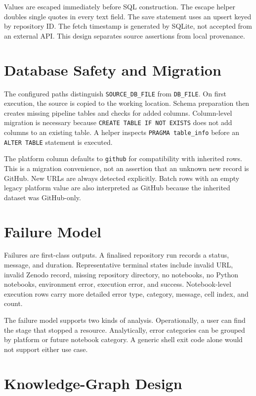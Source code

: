 Values are escaped immediately before SQL construction. The escape helper doubles single quotes in every text field. The save statement uses an upsert keyed by repository ID. The fetch timestamp is generated by SQLite, not accepted from an external API. This design separates source assertions from local provenance.

\section{Database Safety and Migration}

The configured paths distinguish \texttt{SOURCE\_DB\_FILE} from \texttt{DB\_FILE}. On first execution, the source is copied to the working location. Schema preparation then creates missing pipeline tables and checks for added columns. Column-level migration is necessary because \texttt{CREATE TABLE IF NOT EXISTS} does not add columns to an existing table. A helper inspects \texttt{PRAGMA table\_info} before an \texttt{ALTER TABLE} statement is executed.

The platform column defaults to \texttt{github} for compatibility with inherited rows. This is a migration convenience, not an assertion that an unknown new record is GitHub. New URLs are always detected explicitly. Batch rows with an empty legacy platform value are also interpreted as GitHub because the inherited dataset was GitHub-only.

\section{Failure Model}

Failures are first-class outputs. A finalised repository run records a status, message, and duration. Representative terminal states include invalid URL, invalid Zenodo record, missing repository directory, no notebooks, no Python notebooks, environment error, execution error, and success. Notebook-level execution rows carry more detailed error type, category, message, cell index, and count.

The failure model supports two kinds of analysis. Operationally, a user can find the stage that stopped a resource. Analytically, error categories can be grouped by platform or future notebook category. A generic shell exit code alone would not support either use case.

\section{Knowledge-Graph Design}

